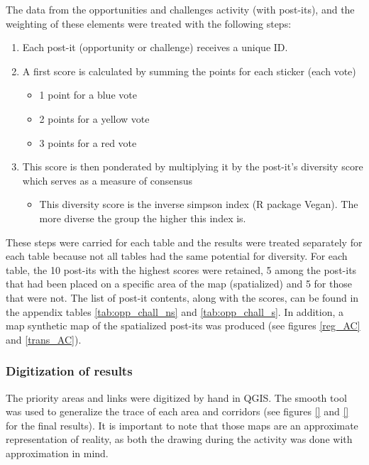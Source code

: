 The data from the opportunities and challenges activity (with post-its), and the weighting of these elements were treated with the following steps:
\begin{enumerate}
  \item Each post-it (opportunity or challenge) receives a unique ID.
  \item A first score is calculated by summing the points for each sticker (each vote)
  \begin{itemize}
      \item 1 point for a blue vote
      \item 2 points for a yellow vote
      \item 3 points for a red vote
  \end{itemize}
  \item This score is then ponderated by multiplying it by the post-it’s diversity score which serves as a measure of consensus
\begin{itemize}
\item This diversity score is the inverse simpson index (R package Vegan). The more diverse the group the higher this index is.
\end{itemize}
\end{enumerate}
These steps were carried for each table and the results were treated separately for each table because not all tables had the same potential for diversity. For each table, the 10 post-its with the highest scores were retained, 5 among the post-its that had been placed on a specific area of the map (spatialized) and 5 for those that were not. The list of post-it contents, along with the scores, can be found in the appendix tables \ref{tab:opp_chall_ns} and \ref{tab:opp_chall_s}. In addition, a map synthetic map of the spatialized post-its was produced (see figures \ref{reg_AC} and \ref{trans_AC}).\\

\subsubsection*{Digitization of results}

The priority areas and links were digitized by hand in QGIS. The smooth tool was used to generalize the trace of each area and corridors (see figures \ref{}  and \ref{} for the final results). It is important to note that those maps are an approximate representation of reality, as both the drawing during the activity was done with approximation in mind.

